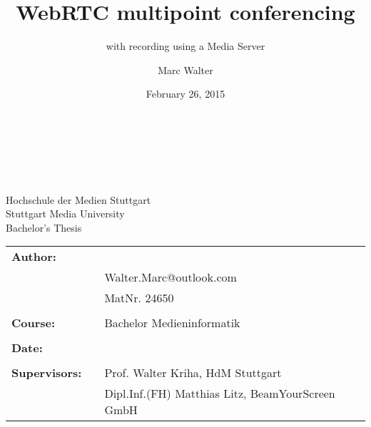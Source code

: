 \title{WebRTC multipoint conferencing}
\subtitle{with recording using a Media Server}
\author{Marc Walter}
\date{February 26, 2015 }

\makeatletter

\begin{titlepage}

	\vspace{\fill}
	\vspace{\fill}


	\vspace{10mm}

	\centering\textbf{\Huge \@title\\ \@subtitle}\\

	\vspace{\fill}

	\centering 
		\@author\\
		Hochschule der Medien Stuttgart\\
		Stuttgart Media University\\
		Bachelor's Thesis

	\vspace{\fill}

	\begin{flushleft}
		\begin{tabular}{llll}
		\textbf{Author:} & & \@author & \\
		& & Walter.Marc@outlook.com & \\
		& & MatNr. 24650 & \\
		& & \\
		\textbf{Course:} & & Bachelor Medieninformatik\\
		& & \\
		\textbf{Date:} & & \@date &\\
		& & \\
		\textbf{Supervisors:} & & Prof. Walter Kriha, HdM Stuttgart &\\
		& & Dipl.Inf.(FH) Matthias Litz, BeamYourScreen GmbH &\\
		\end{tabular}
	\end{flushleft}

\end{titlepage}